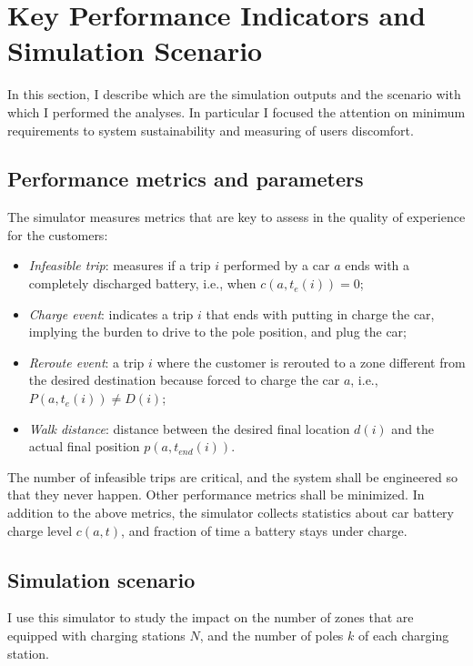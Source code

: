\section{Key Performance Indicators and Simulation Scenario}
\label{sec:5_5_kpi_scenario}
In this section, I describe which are the simulation outputs and the scenario with which I performed the analyses. In particular I focused the attention on minimum requirements to system sustainability and measuring of users discomfort. 

\subsection{Performance metrics and parameters}

The simulator measures metrics that are  key to assess in the quality of experience for the customers:
\begin{itemize}
	\item \emph{Infeasible trip}: measures if a trip $i$ performed by a car $a$ ends with a completely discharged battery, i.e., when $c(a,t_{e}(i))= 0$;
	\item \emph{Charge event}: indicates a trip $i$ that ends with putting in charge the car, implying the burden to drive to the pole position, and plug the car;
	\item \emph{Reroute event}: a trip $i$ where the customer is rerouted to a zone different from the  desired destination because forced to charge the car $a$, i.e., $P(a,t_{e}(i))\neq D(i)$;
	\item \emph{Walk distance}: distance between the desired final location $d(i)$ and the actual final position $p(a,t_{end}(i))$.
\end{itemize}

The number of infeasible trips are critical, and the system shall be engineered so that they never happen. Other performance metrics shall be minimized. 
In addition to the above metrics, the simulator collects statistics about car battery charge level $c(a,t)$, and fraction of time a battery stays under charge.

\subsection{Simulation scenario}

I use this simulator to study the impact on the number of zones that are equipped with charging stations $N$, and the number of poles $k$ of each charging station.

